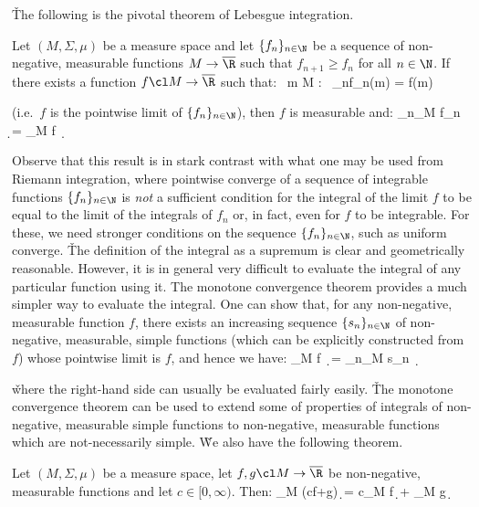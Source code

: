 \v

The following is the pivotal theorem of Lebesgue integration.

Let $(M,\Sigma,\mu)$ be a measure space and let $\{f_n\}_{n\in\N}$ be a sequence of non-negative, measurable
functions $M\to\overline{\R}$ such that $f_{n+1}\geq f_n$ for all $n\in \N$. If there exists a function $f\cl M\to
\overline{\R}$ such that:
\bse
\forall \, m \in M : \ \lim_{n\to\infty}f_n(m) = f(m)
\ese

(i.e.\ $f$ is the pointwise limit of $\{f_n\}_{n\in\N}$), then $f$ is measurable and:
\bse
\lim_{n\to\infty}\int_M\! f_n \, \d \mu = \int_M\! f \, \d \mu
\ese
\et

Observe that this result is in stark contrast with what one may be used from Riemann integration, where pointwise
converge of a sequence of integrable functions $\{f_n\}_{n\in\N}$ is \emph{not} a sufficient condition for the
integral of the limit $f$ to be equal to the limit of the integrals of $f_n$ or, in fact, even for $f$ to be
integrable. For these, we need stronger conditions on the sequence $\{f_n\}_{n\in\N}$, such as uniform converge. \v

The definition of the integral as a supremum is clear and geometrically reasonable. However, it is in general very
difficult to evaluate the integral of any particular function using it. The monotone convergence theorem provides a
much simpler way to evaluate the integral. One can show that, for any non-negative, measurable function $f$, there
exists an increasing sequence $\{s_n\}_{n\in\N}$ of non-negative, measurable, simple functions (which can be
explicitly constructed from $f$) whose pointwise limit is $f$, and hence we have:
\bse
\int_M\! f \, \d \mu = \lim_{n\to\infty}\int_M\! s_n \, \d \mu
\ese

\v

where the right-hand side can usually be evaluated fairly easily. \v

The monotone convergence theorem can be used to extend some of properties of integrals of non-negative, measurable
simple functions to non-negative, measurable functions which are not-necessarily simple. \v

We also have the following theorem.

\bt[]
Let $(M,\Sigma,\mu)$ be a measure space, let $f,g\cl M\to \overline{\R}$ be non-negative, measurable functions and
let $c\in [0,\infty)$. Then:
\bse
\displaystyle \int_{M}\! (cf+g) \,\d \mu = c\int_{M}\! f \,\d \mu + \int_{M}\! g \,\d \mu
\ese
\et

